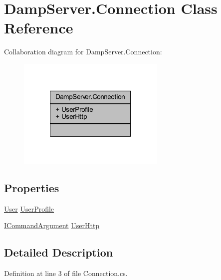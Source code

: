 \hypertarget{class_damp_server_1_1_connection}{\section{Damp\-Server.\-Connection Class Reference}
\label{class_damp_server_1_1_connection}
}


Collaboration diagram for Damp\-Server.\-Connection\-:\nopagebreak
\begin{figure}[H]
\begin{center}
\leavevmode
\includegraphics[width=200pt]{class_damp_server_1_1_connection__coll__graph}
\end{center}
\end{figure}
\subsection*{Properties}
\begin{DoxyCompactItemize}
\item 
\hyperlink{class_damp_server_1_1_user}{User} \hyperlink{class_damp_server_1_1_connection_a19a30edf0b8deb8ec02d257f03ce8633}{User\-Profile}
\item 
\hyperlink{interface_damp_server_1_1_i_command_argument}{I\-Command\-Argument} \hyperlink{class_damp_server_1_1_connection_abd84746d981fefcfcfcda4d4e6fdc218}{User\-Http}
\end{DoxyCompactItemize}


\subsection{Detailed Description}


Definition at line 3 of file Connection.\-cs.



